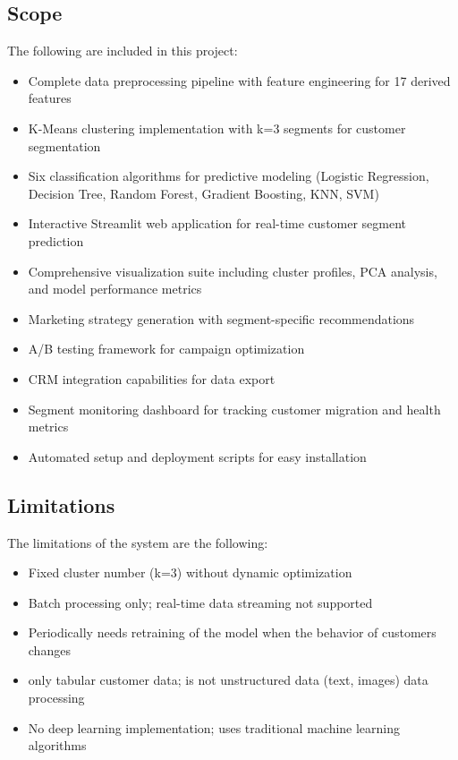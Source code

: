 \documentclass[12pt,a4paper]{report}
\begin{document}
\subsection{Scope}
The following are included in this project:
\begin{itemize}
    \item Complete data preprocessing pipeline with feature engineering for 17 derived features \cite{hughes1994, fader2005}
    \item K-Means clustering implementation with k=3 segments for customer segmentation \cite{macqueen1967}
    \item Six classification algorithms for predictive modeling (Logistic Regression, Decision Tree, Random Forest, Gradient Boosting, KNN, SVM) \cite{hastie2009, breiman2001, vapnik1995}
    \item Interactive Streamlit web application for real-time customer segment prediction \cite{streamlit2019}
    \item Comprehensive visualization suite including cluster profiles, PCA analysis, and model performance metrics \cite{rousseeuw1987}
    \item Marketing strategy generation with segment-specific recommendations \cite{kotler2016}
    \item A/B testing framework for campaign optimization \cite{kohavi2009}
    \item CRM integration capabilities for data export \cite{payne2005}
    \item Segment monitoring dashboard for tracking customer migration and health metrics \cite{neslin2006}
    \item Automated setup and deployment scripts for easy installation \cite{merkel2014}
\end{itemize}

\subsection{Limitations}
The limitations of the system are the following:
\begin{itemize}
    \item Fixed cluster number (k=3) without dynamic optimization
    \item Batch processing only; real-time data streaming not supported
    \item Periodically needs retraining of the model when the behavior of customers changes
    \item only tabular customer data; is not unstructured data (text, images) data processing
    \item No deep learning implementation; uses traditional machine learning algorithms
\end{itemize}
\end{document}
